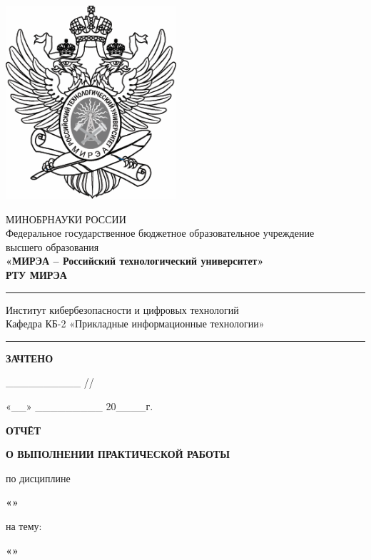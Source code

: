 \fontsize{12}{12}\selectfont
\linespread{1}
\begin{center}
    \includegraphics[scale=0.5]{./title/title.png}
    
    МИНОБРНАУКИ РОССИИ\\
    Федеральное государственное бюджетное образовательное учреждение\\
    высшего образования\\
    \textbf{«МИРЭА -- Российский технологический университет»}\\
    \textbf{РТУ МИРЭА}\\
    \noindent\rule{\textwidth}{1pt}
    Институт кибербезопасности и цифровых технологий\\
    Кафедра КБ-2 «Прикладные информационные технологии»\\ 
    \noindent\rule{\textwidth}{1pt}
    \end{center} 
    \vspace{12pt}
    
    \begin{flushright}
    \textbf {ЗАЧТЕНО}
    
    \_\_\_\_\_\_\_\_\_\_ /\prepodname /
    
    «\_\_» \_\_\_\_\_\_\_\_\_ 20\_\_\_\_г.
    
    \end{flushright}
    \linespread{1.5}
    \vspace{12pt}
    \fontsize{14}{14}\selectfont
    \begin {center}
    \textbf{ОТЧЁТ}
    
    \textbf{О ВЫПОЛНЕНИИ ПРАКТИЧЕСКОЙ РАБОТЫ}
    
    по дисциплине
    
    \textbf{«\discname»}
    
    на тему:
    
    \textbf{«\themename»}
    
    \end {center}

